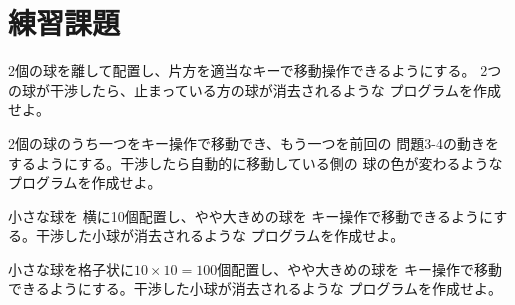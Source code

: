 \section{練習課題} \label{sec:04-q}
\begin{description}
 \myitem 2個の球を離して配置し、片方を適当なキーで移動操作できるようにする。
	2つの球が干渉したら、止まっている方の球が消去されるような
	プログラムを作成せよ。

 \myitem 2個の球のうち一つをキー操作で移動でき、もう一つを前回の
	問題3-4の動きをするようにする。干渉したら自動的に移動している側の
	球の色が変わるようなプログラムを作成せよ。

 \myitem 小さな球を 横に10個配置し、やや大きめの球を
	キー操作で移動できるようにする。干渉した小球が消去されるような
	プログラムを作成せよ。

 \myitem 小さな球を格子状に\(10\times10 = 100\)個配置し、やや大きめの球を
	キー操作で移動できるようにする。干渉した小球が消去されるような
	プログラムを作成せよ。
\end{description}

